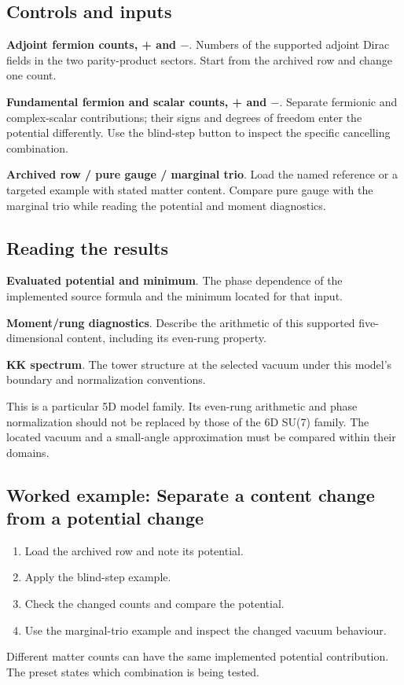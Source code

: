 \documentclass[11pt,a4paper]{article}
\begin{document}
\subsection*{Controls and inputs}
\textbf{Adjoint fermion counts, + and \ensuremath{-}}. Numbers of the supported adjoint Dirac fields in the two parity-product sectors. Start from the archived row and change one count.

\textbf{Fundamental fermion and scalar counts, + and \ensuremath{-}}. Separate fermionic and complex-scalar contributions; their signs and degrees of freedom enter the potential differently. Use the blind-step button to inspect the specific cancelling combination.

\textbf{Archived row / pure gauge / marginal trio}. Load the named reference or a targeted example with stated matter content. Compare pure gauge with the marginal trio while reading the potential and moment diagnostics.

\subsection*{Reading the results}
\textbf{Evaluated potential and minimum}. The phase dependence of the implemented source formula and the minimum located for that input.

\textbf{Moment/rung diagnostics}. Describe the arithmetic of this supported five-dimensional content, including its even-rung property.

\textbf{KK spectrum}. The tower structure at the selected vacuum under this model's boundary and normalization conventions.

This is a particular 5D model family. Its even-rung arithmetic and phase normalization should not be replaced by those of the 6D SU(7) family. The located vacuum and a small-angle approximation must be compared within their domains.
\subsection*{Worked example: Separate a content change from a potential change}
\begin{enumerate}
\item Load the archived row and note its potential.
\item Apply the blind-step example.
\item Check the changed counts and compare the potential.
\item Use the marginal-trio example and inspect the changed vacuum behaviour.
\end{enumerate}
Different matter counts can have the same implemented potential contribution. The preset states which combination is being tested.
\end{document}
